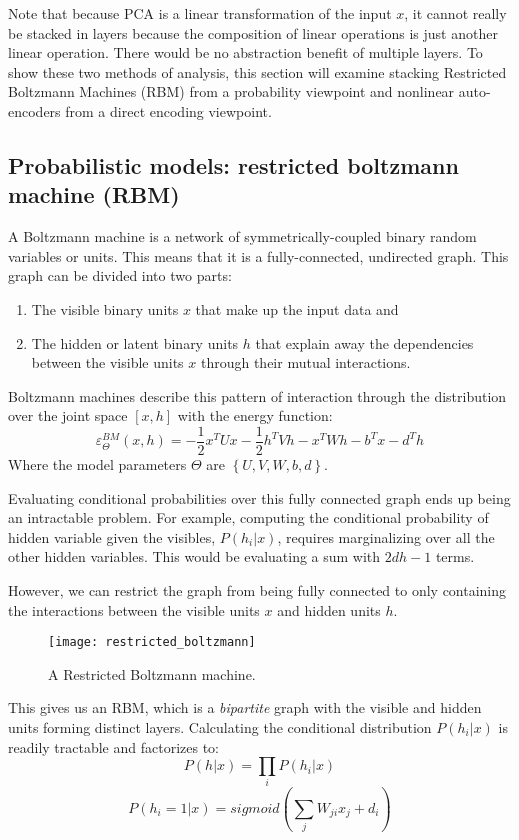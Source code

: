 Note that because PCA is a linear transformation of the input \(x\), it cannot really be stacked in layers because the composition of linear operations is just another linear operation. There would be no abstraction benefit of multiple layers. To show these two methods of analysis, this section will examine stacking Restricted Boltzmann Machines (RBM) from a probability viewpoint and nonlinear auto-encoders from a direct encoding viewpoint.

\subsection{Probabilistic models: restricted boltzmann machine (RBM)}
A Boltzmann machine is a network of symmetrically-coupled binary random variables or units. This means that it is a fully-connected, undirected graph. This graph can be divided into two parts:

\begin{enumerate}
\item The visible binary units \(x\) that make up the input data and
\item The hidden or latent binary units \(h\) that explain away the dependencies between the visible units \(x\) through their mutual interactions.
\end{enumerate}

Boltzmann machines describe this pattern of interaction through the distribution over the joint space \([x,h]\) with the energy function: 
\[\varepsilon_\Theta^{BM} (x,h) = -\frac{1}{2} x^T Ux - \frac{1}{2} h^T Vh - x^T Wh - b^T x - d^T h\]
Where the model parameters \(\Theta\) are \(\left\{U,V,W,b,d\right\}\).

Evaluating conditional probabilities over this fully connected graph ends up being an intractable problem. For example, computing the conditional probability of hidden variable given the visibles, \(P(h_i | x)\), requires marginalizing over all the other hidden variables. This would be evaluating a sum with \(2dh - 1\) terms.

However, we can restrict the graph from being fully connected to only containing the interactions between the visible units \(x\) and hidden units \(h\). 

\begin{figure}[h!]
  \centering
    \texttt{[image: restricted\_boltzmann]}
\caption{A Restricted Boltzmann machine.}
\end{figure}

This gives us an RBM, which is a \emph{bipartite} graph with the visible and hidden units forming distinct layers. Calculating the conditional distribution \(P(h_i | x)\) is readily tractable and factorizes to: 
\[P(h | x) = \prod_i P(h_i | x)\]
\[P(h_i = 1 | x) = sigmoid \left( \sum_j W_{ji} x_j + d_i \right)\]

